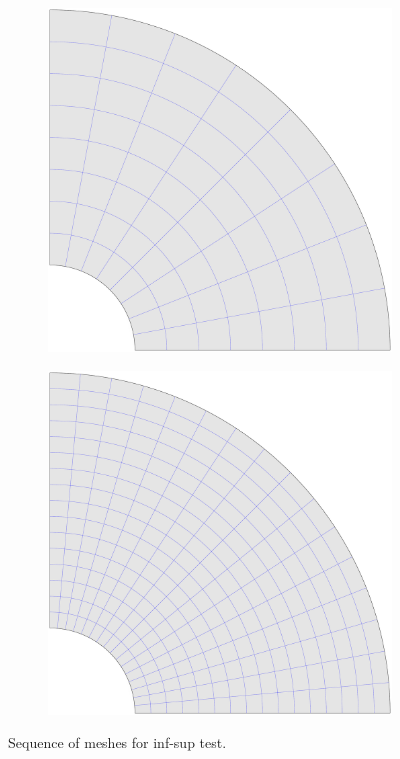 \documentclass{article}
\begin{document}
\begin{figure}
\begin{subfigure}[b]{0.18\linewidth}
    \end{subfigure}
    \begin{subfigure}[b]{0.18\linewidth}        %
        \centering
        \includegraphics[width=\linewidth]{mesh_hole_3}
    \end{subfigure}
    \begin{subfigure}[b]{0.18\linewidth}        %
        \centering
        \includegraphics[width=\linewidth]{mesh_hole_4}
    \end{subfigure}
    \caption{Sequence of meshes for inf-sup test.}
    \label{fig:mesh_hole}
\end{figure}
\end{document}
